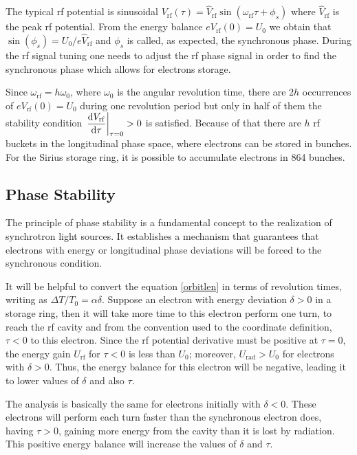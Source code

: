 The typical \gls{rf} potential is sinusoidal $V_{\mathrm{rf}}(\tau) = \hat{V}_{\mathrm{rf}} \sin \left(\omega_{\mathrm{rf}}\tau + \phi_s\right)$ where $\hat{V}_{\mathrm{rf}}$ is the peak \gls{rf} potential. From the energy balance $eV_{\mathrm{rf}}(0) = U_0$ we obtain that $\sin(\phi_s) = U_0/e\hat{V}_{\mathrm{rf}}$ and $\phi_s$ is called, as expected, the synchronous phase. During the \gls{rf} signal tuning one needs to adjust the \gls{rf} phase signal in order to find the synchronous phase which allows for electrons storage.

Since $\omega_{\mathrm{rf}} = h \omega_0$, where $\omega_0$ is the angular revolution time, there are $2h$ occurrences of $eV_{\mathrm{rf}}(0) = U_0$ during one revolution period but only in half of them the stability condition $\left.\dfrac{\mathrm{d} V_{\mathrm{rf}}}{\mathrm{d} \tau}\right|_{\tau = 0} > 0$ is satisfied. Because of that there are $h$ \gls{rf} buckets in the longitudinal phase space, where electrons can be stored in bunches. For the Sirius storage ring, it is possible to accumulate electrons in 864 bunches.

\subsection{Phase Stability}

The principle of phase stability is a fundamental concept to the realization of synchrotron light sources. It establishes a mechanism that guarantees that electrons with energy or longitudinal phase deviations will be forced to the synchronous condition.

It will be helpful to convert the equation \eqref{orbitlen} in terms of revolution times, writing as $\Delta T/T_0 = \alpha \delta$. Suppose an electron with energy deviation $\delta > 0$ in a storage ring, then it will take more time to this electron perform one turn, to reach the \gls{rf} cavity and from the convention used to the coordinate definition, $\tau < 0$ to this electron. Since the \gls{rf} potential derivative must be positive at $\tau = 0$, the energy gain $U_{\mathrm{rf}}$ for $\tau < 0$ is less than $U_0$; moreover, $U_{\mathrm{rad}} > U_0$ for electrons with $\delta > 0$. Thus, the energy balance for this electron will be negative, leading it to lower values of $\delta$ and also $\tau$.

The analysis is basically the same for electrons initially with $\delta < 0$. These electrons will perform each turn faster than the synchronous electron does, having $\tau > 0$, gaining more energy from the cavity than it is lost by radiation. This positive energy balance will increase the values of $\delta$ and $\tau$.

